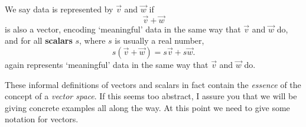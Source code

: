 \documentclass{ximera}
\begin{document}
\begin{definition}
  We say data is represented by  $\vec{v}$ and $\vec{w}$
  if
  \[
  \vec{v}+\vec{w}
  \]
  is also a vector, encoding `meaningful' data in the same way that
  $\vec{v}$ and $\vec{w}$ do, and for all \textbf{scalars} $s$, where
  $s$ is usually a real number,
  \[
  s(\vec{v} + \vec{w}) = s\vec{v}+ s\vec{w}.
  \]
  again represents `meaningful' data in the same way that $\vec{v}$
  and $\vec{w}$ do.
\end{definition}

These informal definitions of vectors and scalars in fact contain the
\textit{essence} of the concept of a \textit{vector space}. If this
seems too abstract, I assure you that we will be giving concrete
examples all along the way. At this point we need to give some
notation for vectors.
\end{document}

